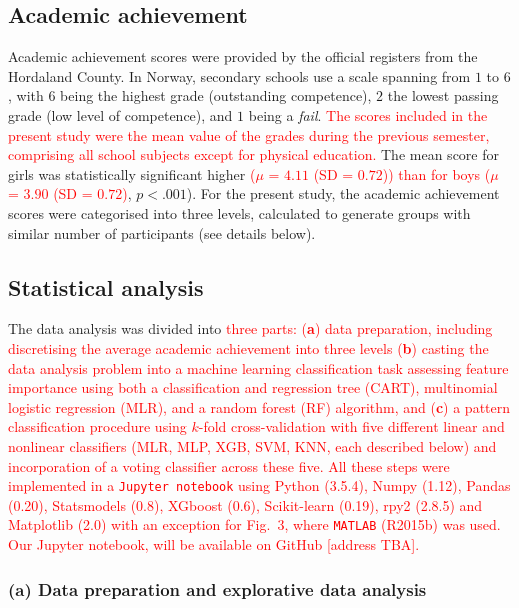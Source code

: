 \documentclass[10pt,letterpaper]{article}
\begin{document}
\subsection*{Academic achievement}
Academic achievement scores were provided by the official registers from the Hordaland County. In Norway, secondary schools use a scale spanning from $1$ to $6$, with $6$ 
being the highest grade (outstanding competence),  $2$  the lowest passing grade (low level of competence), and $1$ being a {\it fail}. 
\textcolor{red}{The scores included in the present study were the mean value of the grades during the previous semester, comprising all school subjects except for physical education. }
The mean score for girls was statistically significant higher  \textcolor{red}{($\mu$ = $4.11$ (SD = $0.72$)) than for boys {($\mu$ = $3.90$ (SD = $0.72$)}}, $p  <  .001$). 
For the present study, the academic achievement scores were categorised into three levels, calculated to generate groups with similar number of participants (see details below). 



\subsection*{Statistical analysis}
The data analysis was divided into \textcolor{red}{three parts: ({\bf  a}) data preparation, including discretising the average academic achievement into three levels  ({\bf b}) casting the data analysis problem 
into a machine learning classification task assessing feature importance using both 
a classification and regression tree (CART), multinomial logistic regression (MLR), and a random forest (RF) algorithm, and ({\bf c}) a pattern 
classification procedure using $k$-fold cross-validation with five different linear and nonlinear classifiers (MLR, MLP, XGB, SVM, KNN, each described below) and incorporation of
a voting classifier across  these five.
All these steps were implemented in a {\tt Jupyter notebook}  using Python (3.5.4), Numpy (1.12), Pandas (0.20), Statsmodels (0.8),  XGboost (0.6), Scikit-learn (0.19),  rpy2 (2.8.5)
and Matplotlib (2.0) with an exception for Fig.~3,
where {\tt MATLAB} (R2015b) was used. Our Jupyter notebook, will be available on GitHub [address TBA].}  

\vspace{3mm}
\subsubsection*{(a) Data preparation and explorative data analysis}
\end{document}
